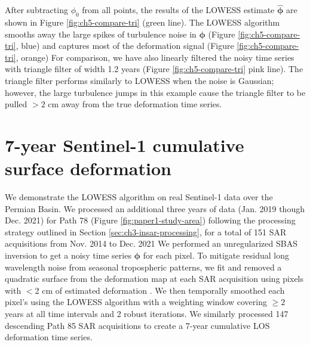 After subtracting $ \phi_0 $ from all points, the results of the LOWESS estimate $ \bm{\hat{\phi}} $ are shown in Figure \ref{fig:ch5-compare-tri} (green line). The LOWESS algorithm smooths away the large spikes of turbulence noise in  $ \bm{\phi} $ (Figure \ref{fig:ch5-compare-tri}, blue) and captures most of the deformation signal (Figure \ref{fig:ch5-compare-tri}, orange)
For comparison, we have also linearly filtered the noisy time series with triangle filter of width 1.2 years (Figure \ref{fig:ch5-compare-tri} pink line). 
The triangle filter performs similarly to LOWESS when the noise is Gaussian; however, the large turbulence jumps in this example cause the triangle filter to be pulled $>2$ cm away from the true deformation time series.





\section{7-year Sentinel-1 cumulative surface deformation}

We demonstrate the LOWESS algorithm on real Sentinel-1 data over the Permian Basin.
We processed an additional three years of data (Jan. 2019 though Dec. 2021) for Path 78 (Figure \ref{fig:paper1-study-area}) following the processing strategy outlined in Section \ref{sec:ch3-insar-processing}, for a total of 151 SAR acquisitions from Nov. 2014 to Dec. 2021
We performed an unregularized SBAS inversion to get a noisy time series $ \bm{\phi} $ for each pixel. 
To mitigate residual long wavelength noise from seasonal tropospheric patterns, we fit and removed a quadratic surface from the deformation map at each SAR acquisition using pixels with $<$2 cm of estimated deformation \citep{Morishita2020LicsbasOpenSource}. We then temporally smoothed each pixel's using the LOWESS algorithm with a weighting window covering $\geq 2$ years at all time intervals and 2 robust iterations. We similarly processed 147 descending Path 85 SAR acquisitions to create a 7-year cumulative LOS deformation time series.

